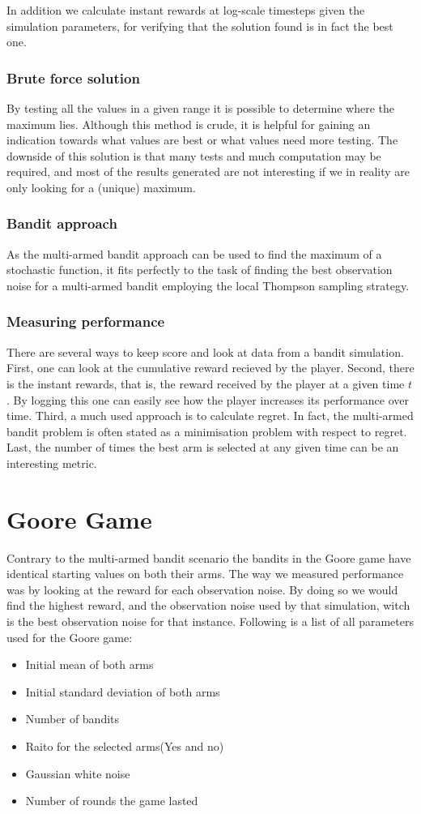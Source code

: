 In addition we calculate instant rewards at log-scale timesteps given the simulation parameters, for verifying that the solution found is in fact the best one.

\subsubsection{Brute force solution}
By testing all the values in a given range it is possible to determine where the maximum lies.
Although this method is crude, it is helpful for gaining an indication towards what values are best or what values need more testing.
The downside of this solution is that many tests and much computation may be required, and most of the results generated are not interesting if we in reality are only looking for a (unique) maximum.

\subsubsection{Bandit approach}
As the multi-armed bandit approach can be used to find the maximum of a
stochastic function, it fits perfectly to the task of finding the best
observation noise for a multi-armed bandit employing the local Thompson
sampling strategy.

\subsubsection{Measuring performance}
There are several ways to keep score and look at data from a bandit simulation.
First, one can look at the cumulative reward recieved by the player.
Second, there is the instant rewards, that is, the reward received by the player at a given time $t$.
By logging this one can easily see how the player increases its performance over time.
Third, a much used approach is to calculate regret.
In fact, the multi-armed bandit problem is often stated as a minimisation problem with respect to regret.
Last, the number of times the best arm is selected at any given time can be an interesting metric.

\section{Goore Game}
Contrary to the multi-armed bandit scenario the bandits in the Goore game have identical starting
values on both their arms. The way we measured performance was by looking at the reward for each observation
noise. By doing so we would find the highest reward, and the observation noise used by that simulation, witch
is the best observation noise for that instance. Following is a list of all parameters used for the Goore game:
\begin{itemize}
\item Initial mean of both arms
\item Initial standard deviation of both arms
\item Number of bandits
\item Raito for the selected arms(Yes and no)
\item Gaussian white noise
\item Number of rounds the game lasted
\end{itemize}

